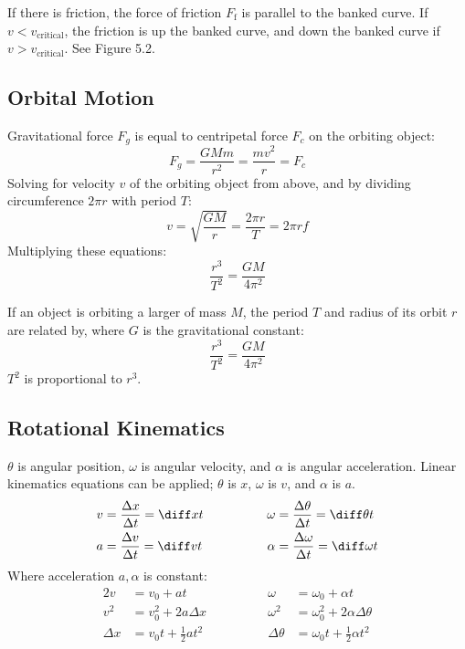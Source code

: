 \documentclass{article}
\newcommand{\theorem}[2]{\begin{tcolorbox}[title={#1},colback=blue!5!white,colframe=blue!75!black,parbox=false] #2 \end{tcolorbox}}
\begin{document}
If there is friction, the force of friction $F_ \text{f}$ is parallel to the banked curve. If $v<v_ \text{critical}$, the friction is up the banked curve, and down the banked curve if $v> v_ \text{critical}$. See Figure 5.2.

\subsection{Orbital Motion}

Gravitational force $F_g$ is equal to centripetal force $F_c$ on the orbiting object:
\begin{equation*}
    F_g
	=\frac{GMm}{r^2}
    =\frac{mv^2}{r}
	=F_c
\end{equation*}
Solving for velocity $v$ of the orbiting object from above, and by dividing circumference $2\pi r$ with period $T$:
\begin{equation*}
	v=\sqrt{\frac{GM}{r}}
	=\frac{2\pi r}{T}
	=2\pi r f
\end{equation*}
Multiplying these equations:
\begin{equation*}
    \frac{r^3}{T^2}
	=\frac{GM}{4\pi^2}
\end{equation*}

\theorem{Kepler's third law}{
	If an object is orbiting a larger of mass $M$, the period $T$ and radius of its orbit $r$ are related by, where $G$ is the gravitational constant:
	\begin{equation*}
		\frac{r^3}{T^2}=\frac{GM}{4\pi^2}
	\end{equation*}
	$T^2$ is proportional to $r^3$.
}

\subsection{Rotational Kinematics}

\theorem{Rotational kinematics basics}{$\theta$ is angular position, $\omega$ is angular velocity, and $\alpha$ is angular acceleration. Linear kinematics equations can be applied; $\theta$ is $x$, $\omega$ is $v$, and $\alpha$ is $a$.
\begin{alignat*}{2}
	v
	&=\frac{\Delta x}{\Delta t}=\diff xt
	&\qquad\qquad
	\omega
	&=\frac{\Delta \theta}{\Delta t}=\diff \theta t \\
	a
	&=\frac{\Delta v}{\Delta t}=\diff vt
	&\qquad\qquad
	\alpha
	&=\frac{\Delta \omega}{\Delta t}=\diff \omega t
\end{alignat*}
Where acceleration $a,\alpha$ is constant:
\begin{alignat*}{2}
	v 
	&=v_0+at
	&\qquad\qquad
	\omega 
	&=\omega_0+\alpha t \\
	v^2
	&=v_0^2+2a\Delta x
	&\qquad\qquad
	\omega^2
	&=\omega_0^2+2\alpha \Delta \theta \\
	\Delta x
	&=v_0t+\frac12at^2
	&\qquad\qquad
	\Delta \theta
	&=\omega_0t +\frac12\alpha t^2
\end{alignat*}
}
\end{document}
